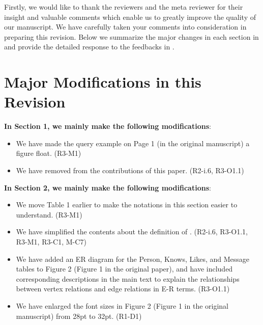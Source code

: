 Firstly, we would like to thank the reviewers and the meta reviewer for their insight and valuable comments which enable us to greatly improve the quality of our manuscript. We have carefully taken your comments into consideration in preparing this revision.
Below we summarize the major changes in each section in  and provide the detailed response to the feedbacks in .


\section{Major Modifications in this Revision}
\label{sec:modifications}

\textbf{In Section 1, we mainly make the following modifications}:
\begin{itemize}
	\item We have made the query example on Page 1 (in the original manuscript) a figure float. (R3-M1)
	\item We have removed \rgmapping from the contributions of this paper. (R2-i.6, R3-O1.1)
\end{itemize}

\textbf{In Section 2, we mainly make the following modifications}:
\begin{itemize}
	\item We move Table 1 earlier to make the notations in this section easier to understand. (R3-M1)
	\item We have simplified the contents about the definition of \rgmapping. (R2-i.6, R3-O1.1, R3-M1, R3-C1, M-C7)
	\item We have added an ER diagram for the Person, Knows, Likes, and Message tables to Figure 2 (Figure 1 in the original paper), and have included corresponding descriptions in the main text to explain the relationships between vertex relations and edge relations in E-R terms. (R3-O1.1)
	\item We have enlarged the font sizes in Figure 2 (Figure 1 in the original manuscript) from 28pt to 32pt. (R1-D1)
\end{itemize}

